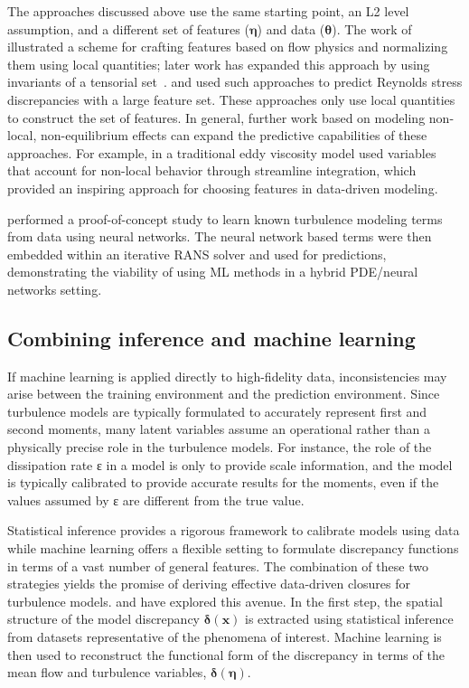 \documentclass[a4paper]{ar-1col}
\begin{document}
 The approaches discussed above use the same starting point, an L2 level assumption, and a different set of features ($\bm{\eta}$) and data ($\bm{\theta}$).
 The work of \citet{ling2015evaluation} illustrated a scheme for crafting features based on flow physics and normalizing them  using local  quantities; later work has expanded this approach
 by using invariants of a tensorial set~\citep{ling2016machine}. \cite{wang2017physics-informed} and \citet{wu2018data-driven} used such approaches to predict Reynolds stress discrepancies with a large feature set.
These approaches only use local quantities to construct  the set of features.
 In general, further work  based on modeling non-local, non-equilibrium effects can expand the predictive capabilities of these approaches.
For example, in a traditional eddy viscosity model \citet{hamlington2008reynolds} used variables that account for non-local behavior through streamline integration, which provided an inspiring approach for choosing features in data-driven modeling.
 
\citet{tracey2015machine} performed a proof-of-concept study to learn known turbulence modeling terms from data using neural networks. The neural network based terms were then embedded within an iterative RANS solver and used for predictions, demonstrating the viability of using ML methods in a hybrid PDE/neural networks setting. 
 
\subsection{Combining inference and machine learning}

If machine learning is applied directly to high-fidelity data, inconsistencies may arise between the training environment and the prediction environment. Since turbulence models are typically formulated to accurately represent first and second moments, many latent variables assume an operational rather than a physically precise role in the turbulence models. For instance, the role of the dissipation rate ε in a model is only to provide scale information, and the model is typically calibrated to provide accurate results for the moments, even if the values assumed by ε are different from the true value.

Statistical inference provides a rigorous framework to calibrate models using data while machine learning offers 
a flexible setting to formulate discrepancy functions in terms of a vast number of general features.
The combination of these two strategies yields the promise of deriving effective data-driven closures for turbulence models.   
\citet{duraisamy2015new} and \citet{parish2016paradigm} have explored this avenue.  In the first step, the  spatial structure of the model
discrepancy $\bm{\delta}(\bm{x})$ is extracted using statistical inference from datasets representative of the phenomena of interest.
Machine learning is then used to reconstruct the functional form of the discrepancy in terms of the mean flow and turbulence variables, $\bm{\delta}(\bm{\eta})$.
\end{document}
